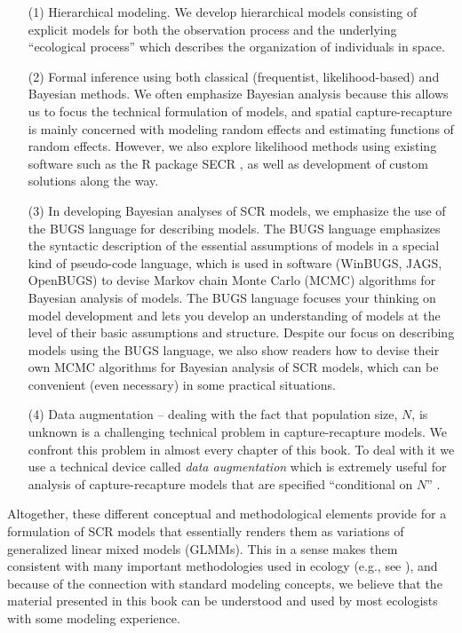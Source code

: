 \begin{itemize}
\item[(1)] Hierarchical modeling. We develop hierarchical models
  consisting of explicit models for both the observation process and
  the underlying ``ecological process'' which describes the
  organization of individuals in space.

\item[(2)] Formal inference using both classical (frequentist,
  likelihood-based) and Bayesian methods. We often emphasize
  Bayesian analysis because this allows us to focus the technical
  formulation of models, and spatial capture-recapture is mainly
  concerned with modeling random effects and estimating functions of
  random effects. However, we also explore likelihood methods using existing
  software such as the R package SECR \citep{efford:2011}, as well as
  development of custom solutions along the way.

\item[(3)] In developing Bayesian analyses of SCR models, we emphasize
  the use of the BUGS language for describing models. The BUGS
  language emphasizes the syntactic description of the essential
  assumptions of models in a special kind of pseudo-code language,
  which is used in software (WinBUGS, JAGS, OpenBUGS) to devise Markov
  chain Monte Carlo (MCMC) algorithms for Bayesian analysis of
  models. The BUGS language focuses your thinking on model development
  and lets you develop an understanding of models at the level of
  their basic assumptions and structure.  Despite our focus on
  describing models using the BUGS language, we also show readers how
  to devise their own MCMC algorithms for Bayesian analysis of SCR
  models, which can be convenient (even necessary) in some practical
  situations.

\item[(4)] Data augmentation -- dealing with the fact that population
  size, $N$, is unknown is a challenging technical problem in
  capture-recapture models. We confront this problem in almost every
  chapter of this book. To deal with it we use a technical device
  called {\it data augmentation} which is extremely useful for
  analysis of capture-recapture models that are specified
  ``conditional on $N$'' \citep{royle_etal:2007}.
\end{itemize}

Altogether, these different conceptual and methodological elements
provide for a formulation of SCR models that essentially renders them
as variations of generalized linear mixed models (GLMMs). This in a
sense makes them consistent with many important methodologies used in
ecology (e.g., see \citet{zuur_etal:2009, kery_etal:2010}), and
because of the connection with standard modeling concepts, we believe
that the material presented in this book can be understood and used by
most ecologists with some modeling experience.

